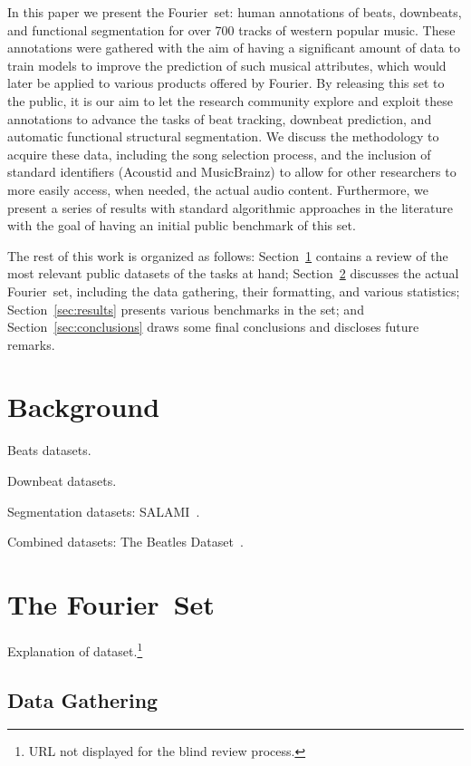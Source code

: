 \documentclass{article}
\newcommand{\setName}{Fourier}
\begin{document}
In this paper we present the \setName~set: human annotations of beats, downbeats, and functional segmentation for over 700 tracks of western popular music.
These annotations were gathered with the aim of having a significant amount of data to train models to improve the prediction of such musical attributes, which would later be applied to various products offered by \setName.
By releasing this set to the public, it is our aim to let the research community explore and exploit these annotations to advance the tasks of beat tracking, downbeat prediction, and automatic functional structural segmentation.
We discuss the methodology to acquire these data, including the song selection process, and the inclusion of standard identifiers (Acoustid and MusicBrainz) to allow for other researchers to more easily access, when needed, the actual audio content.
Furthermore, we present a series of results with standard algorithmic approaches in the literature with the goal of having an initial public benchmark of this set.

The rest of this work is organized as follows: Section~\ref{sec:background} contains a review of the most relevant public datasets of the tasks at hand; Section~\ref{sec:dataset} discusses the actual \setName~set, including the data gathering, their formatting, and various statistics; Section~\ref{sec:results} presents various benchmarks in the set; and Section~\ref{sec:conclusions} draws some final conclusions and discloses future remarks.
%
\section{Background}\label{sec:background}

Beats datasets.

Downbeat datasets.

Segmentation datasets: SALAMI~\cite{Smith2011}.

Combined datasets: The Beatles Dataset~\cite{Mauch2009a}.

\section{The \setName~Set}\label{sec:dataset}

Explanation of dataset.\footnote{URL not displayed for the blind review process.}

\subsection{Data Gathering}
\end{document}
